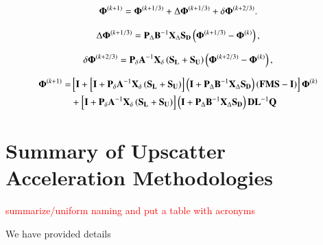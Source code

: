 \documentclass[preprint,10pt]{elsarticle}
\newcommand{\tcr}[1]{\textcolor{red}{#1}}
\begin{document}
\begin{equation}
\label{eq::DSA_MJIA_update_op}
{\bf \Phi}^{(k+1)} = {\bf \Phi}^{(k+1/3)} + \Delta {\bf \Phi}^{(k+1/3)} + \delta {\bf \Phi}^{(k+2/3)}.
\end{equation}

\begin{equation}
\label{eq::DSA_TG_Jac_WIG_phiterm}
 \Delta {\bf \Phi}^{(k+1/3)} = {\bf P}_{\Delta} {\bf B}^{-1} {\bf X}_{\Delta} {\bf S_D} \left(  {\bf \Phi}^{(k+1/3)} - {\bf \Phi}^{(k)} \right),
\end{equation}

\begin{equation}
\label{eq::DSA_TG_Jac_1G_solterm}
  \delta {\bf \Phi}^{(k+2/3)}  ={\bf P}_{\delta}{\bf A}^{-1}  {\bf X}_{\delta}\left(   {\bf S_L} +  {\bf S_U} \right) \left(  {\bf \Phi}^{(k+2/3)} - {\bf \Phi}^{(k)}  \right),
\end{equation}

\begin{equation}
\label{eq::DSA_TG_Jac_update_FULL}
\begin{aligned}
{\bf \Phi}^{(k+1)} =& \left[ {\bf I} +\left[ {\bf I}+ {\bf P}_{\delta}{\bf A}^{-1}  {\bf X}_{\delta}\left(   {\bf S_L} +  {\bf S_U} \right) \right]    \left(  {\bf I} + {\bf P}_{\Delta} {\bf B}^{-1} {\bf X}_{\Delta} {\bf S_D} \right) \left(   {\bf F}  {\bf M} {\bf S}  - {\bf I} \right)   \right]{\bf \Phi}^{(k)} \\
&+  \left[ {\bf I}+ {\bf P}_{\delta}{\bf A}^{-1}  {\bf X}_{\delta}\left(   {\bf S_L} +  {\bf S_U} \right) \right]  \left(  {\bf I} + {\bf P}_{\Delta} {\bf B}^{-1} {\bf X}_{\Delta} {\bf S_D} \right) {\bf D} {\bf L}^{-1} {\bf Q} \\
\end{aligned}
\end{equation}


\section{Summary of Upscatter Acceleration Methodologies} \label{sec::summary}

\tcr{summarize/uniform naming and put a table with acronyms}

We have provided details
\end{document}
